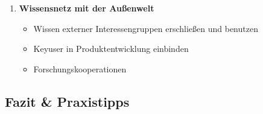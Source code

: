{\begin{enumerate}
    \begin{itemize}
      \item Vorteile von Bürokratie (Sammeln, Formalisieren von Wissen) und Arbeitsgruppe (Flexibilität, Generieren von Wissen) nutzen
      \item Zusammenfassung des Wissens in Wissensbasis
    \end{itemize}
    \item \textbf{Wissensnetz mit der Außenwelt}
    \begin{itemize}
      \item Wissen externer Interessengruppen erschließen und benutzen
      \item Keyuser in Produktentwicklung einbinden
      \item Forschungskooperationen
    \end{itemize}
  \end{enumerate}
}

\subsection{Fazit \& Praxistipps}

